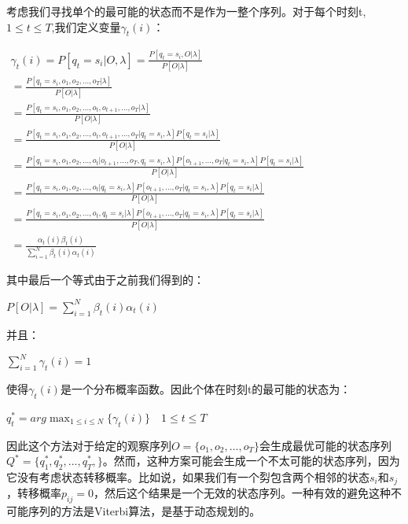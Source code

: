 \documentclass[UTF8]{ctexart}
\begin{document}
考虑我们寻找单个的最可能的状态而不是作为一整个序列。对于每个时刻t,$1\le t\le T$,我们定义变量$\gamma_t(i)$：

\begin{center}
$
\begin{aligned}
\gamma_t(i)=P[q_t=s_i|O,\lambda]=\frac{P[q_t=s_i,O|\lambda]}{P[O|\lambda]}\\
=\frac{P[q_t=s_i,o_1,o_2,...,o_T|\lambda]}{P[O|\lambda]}\\
=\frac{P[q_t=s_i,o_1,o_2,...,o_t,o_{t+1},...,o_T|\lambda]}{P[O|\lambda]}\\
=\frac{P[q_t=s_i,o_1,o_2,...,o_t,o_{t+1},...,o_T|q_t=s_i,\lambda]P[q_t=s_i|\lambda]}{P[O|\lambda]}\\
=\frac{P[q_t=s_i,o_1,o_2,...,o_t|o_{t+1},...,o_T,q_t=s_i,\lambda]P[o_{t+1},...,o_T|q_t=s_i,\lambda]P[q_t=s_i|\lambda]}{P[O|\lambda]}\\
=\frac{P[q_t=s_i,o_1,o_2,...,o_t|q_t=s_i,\lambda]P[o_{t+1},...,o_T|q_t=s_i,\lambda]P[q_t=s_i|\lambda]}{P[O|\lambda]}\\
=\frac{P[q_t=s_i,o_1,o_2,...,o_t,q_t=s_i|\lambda]P[o_{t+1},...,o_T|q_t=s_i,\lambda]P[q_t=s_i|\lambda]}{P[O|\lambda]}\\
=\frac{\alpha_t(i)\beta_t(i)}{\sum_{i=1}^N\beta_t(i)\alpha_t(i)}
\end{aligned}$
\end{center}

其中最后一个等式由于之前我们得到的：

\begin{center}
$
P[O|\lambda]=\sum_{i=1}^N\beta_t(i)\alpha_t(i)
$
\end{center}

并且：

\begin{center}
$
\sum_{i=1}^N\gamma_t(i)=1
$
\end{center}

使得$\gamma_t(i)$是一个分布概率函数。因此个体在时刻t的最可能的状态为：

\begin{center}
$
q_t^*=arg \max_{1\le i \le N}\{\gamma_t(i)\}\quad 1 \le t\le T
$
\end{center}

因此这个方法对于给定的观察序列$O=\{o_1,o_2,...,o_T\}$会生成最优可能的状态序列$Q^*=\{q_1^*,q_2^*,...,q_T^*,\}$。然而，这种方案可能会生成一个不太可能的状态序列，因为它没有考虑状态转移概率。比如说，如果我们有一个劽包含两个相邻的状态$s_i$和$s_j$，转移概率$p_{ij}=0$，然后这个结果是一个无效的状态序列。一种有效的避免这种不可能序列的方法是Viterbi算法，是基于动态规划的。
\end{document}
